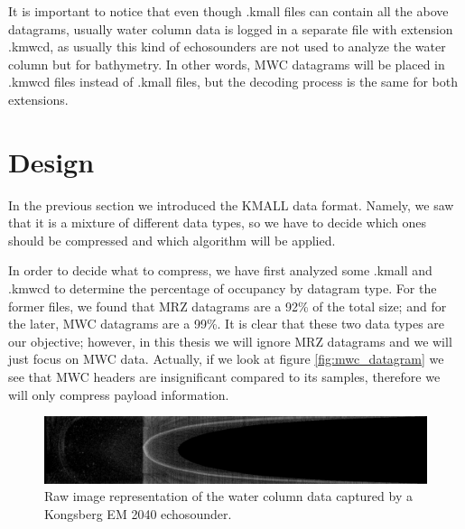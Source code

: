 It is important to notice that even though .kmall files can contain all the above datagrams, usually water column data is logged in a separate file with extension .kmwcd, as usually this kind of echosounders are not used to analyze the water column but for bathymetry. In other words, MWC datagrams will be placed in .kmwcd files instead of .kmall files, but the decoding process is the same for both extensions.

\section{Design}

In the previous section we introduced the KMALL data format. Namely, we saw that it is a mixture of different data types, so we have to decide which ones should be compressed and which algorithm will be applied.

In order to decide what to compress, we have first analyzed some .kmall and .kmwcd to determine the percentage of occupancy by datagram type. For the former files, we found that MRZ datagrams are a 92\% of the total size; and for the later, MWC datagrams are a 99\%. It is clear that these two data types are our objective; however, in this thesis we will ignore MRZ datagrams and we will just focus on MWC data. Actually, if we look at figure \ref{fig:mwc_datagram} we see that MWC headers are insignificant compared to its samples, therefore we will only compress payload information.

\begin{figure}[h!]
	\begin{center}
		\includegraphics[scale=0.3]{images/water_column_data.png}
	\end{center}
	\caption{Raw image representation of the water column data captured by a Kongsberg EM 2040 echosounder.}
	\label{fig:wc_data}
\end{figure}



